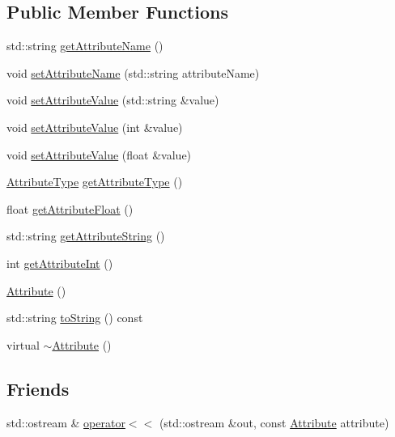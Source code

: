 \subsection*{Public Member Functions}
\begin{DoxyCompactItemize}
\item 
std\-::string \hyperlink{classccmc_1_1_attribute_a4c1cb6f974a0c9fcd301e5e1b522f01b}{get\-Attribute\-Name} ()
\item 
void \hyperlink{classccmc_1_1_attribute_a26894d09527f45cf5f43b799cbce6db1}{set\-Attribute\-Name} (std\-::string attribute\-Name)
\item 
void \hyperlink{classccmc_1_1_attribute_a8430f2e0b3fe3792e39132785ed87874}{set\-Attribute\-Value} (std\-::string \&value)
\item 
void \hyperlink{classccmc_1_1_attribute_adcc682edbbbf610424e559d47d0fe7e8}{set\-Attribute\-Value} (int \&value)
\item 
void \hyperlink{classccmc_1_1_attribute_a27e391143448b28032c6920fe2882142}{set\-Attribute\-Value} (float \&value)
\item 
\hyperlink{classccmc_1_1_attribute_a4b2de185d21d77a8dd84ed192c08e6dc}{Attribute\-Type} \hyperlink{classccmc_1_1_attribute_a47369f077a44690c3a0cc99cc2a40142}{get\-Attribute\-Type} ()
\item 
float \hyperlink{classccmc_1_1_attribute_a58c473ab213fc55f6f68f6fee311ec52}{get\-Attribute\-Float} ()
\item 
std\-::string \hyperlink{classccmc_1_1_attribute_ad1f07128784fe7f0416edc4a813ab1b6}{get\-Attribute\-String} ()
\item 
int \hyperlink{classccmc_1_1_attribute_af808a85742d9649cfe6fc218546303ac}{get\-Attribute\-Int} ()
\item 
\hyperlink{classccmc_1_1_attribute_abcb1a4d1ba3e9db38bda34410c3d6a6e}{Attribute} ()
\item 
std\-::string \hyperlink{classccmc_1_1_attribute_a8b5b6d5379f7b88cef4d79c2a494095d}{to\-String} () const 
\item 
virtual \hyperlink{classccmc_1_1_attribute_a38d5132b32554f2303d29f8f0e62e9b1}{$\sim$\-Attribute} ()
\end{DoxyCompactItemize}
\subsection*{Friends}
\begin{DoxyCompactItemize}
\item 
std\-::ostream \& \hyperlink{classccmc_1_1_attribute_a046dcd1efeb7b260e948652d8de23250}{operator$<$$<$} (std\-::ostream \&out, const \hyperlink{classccmc_1_1_attribute}{Attribute} attribute)
\end{DoxyCompactItemize}



